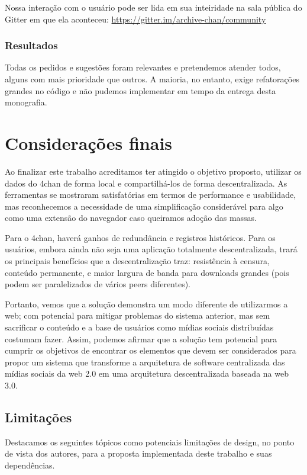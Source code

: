 Nossa interação com o usuário pode ser lida em sua inteiridade na sala pública do Gitter em que ela aconteceu: \url{https://gitter.im/archive-chan/community}

\subsection{Resultados}

Todas os pedidos e sugestões foram relevantes e pretendemos atender todos, alguns com mais prioridade que outros.
A maioria, no entanto, exige refatorações grandes no código e não pudemos implementar em tempo da entrega desta monografia.

\chapter{Considerações finais}

Ao finalizar este trabalho acreditamos ter atingido o objetivo proposto, utilizar os dados do 4chan de forma local e compartilhá-los de forma descentralizada.
As ferramentas se mostraram satisfatórias em termos de performance e usabilidade, mas reconhecemos a necessidade de uma simplificação considerável para algo como uma extensão do navegador caso queiramos adoção das massas.

Para o 4chan, haverá ganhos de redundância e registros históricos.
Para os usuários, embora ainda não seja uma aplicação totalmente descentralizada, trará os principais benefícios que a descentralização traz: resistência à censura, conteúdo permanente, e maior largura de banda para downloads grandes (pois podem ser paralelizados de vários peers diferentes).

Portanto, vemos que a solução demonstra um modo diferente de utilizarmos a web; com potencial para mitigar problemas do sistema anterior, mas sem sacrificar o conteúdo e a base de usuários como mídias sociais distribuídas costumam fazer.
Assim, podemos afirmar que a solução tem potencial para cumprir os objetivos de encontrar os elementos que devem ser considerados para propor um sistema que transforme a arquitetura de software centralizada das mídias sociais da web 2.0 em uma arquitetura descentralizada baseada na web 3.0.

\section{Limitações}

Destacamos os seguintes tópicos como potenciais limitações de design, no ponto de vista dos autores, para a proposta implementada deste trabalho e suas dependências.

